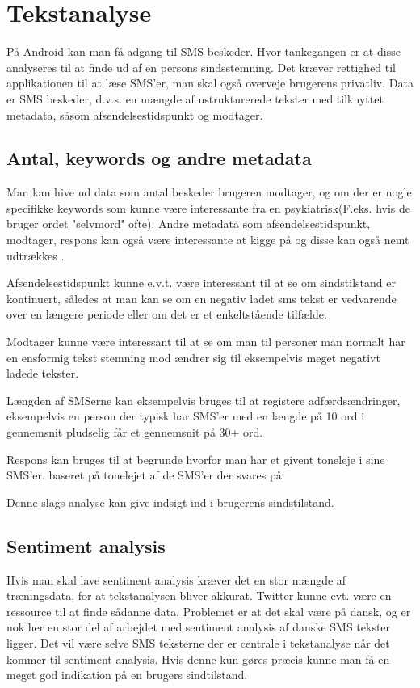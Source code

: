 \section{Tekstanalyse}
På Android kan man få adgang til SMS beskeder. Hvor tankegangen er at disse analyseres til at finde ud af en persons sindsstemning. Det kræver rettighed til applikationen til at læse SMS'er, man skal også overveje brugerens privatliv. Data er SMS beskeder, d.v.s. en mængde af ustrukturerede tekster med tilknyttet metadata, såsom afsendelsestidspunkt og modtager.

\subsection{Antal, keywords og andre metadata}
Man kan hive ud data som antal beskeder brugeren modtager, og om der er nogle specifikke keywords som kunne være interessante fra en psykiatrisk(F.eks. hvis de bruger ordet "selvmord" ofte). Andre metadata som afsendelsestidspunkt, modtager, respons kan også være interessante at kigge på og disse kan også nemt udtrækkes \citep{misc:androidsmsread}.

Afsendelsestidspunkt kunne e.v.t. være interessant til at se om sindstilstand er kontinuert, således at man kan se om en negativ ladet sms tekst er vedvarende over en længere periode eller om det er et enkeltstående tilfælde.
		
Modtager kunne være interessant til at se om man til personer man normalt har en ensformig tekst stemning mod ændrer sig til eksempelvis meget negativt ladede tekster.

Længden af SMSerne kan eksempelvis bruges til at registere adfærdsændringer, eksempelvis en person der typisk har SMS'er med en længde på 10 ord i gennemsnit pludselig får et gennemsnit på 30+ ord.

Respons kan bruges til at begrunde hvorfor man har et givent toneleje i sine SMS'er. baseret på tonelejet af de SMS'er der svares på.

Denne slags analyse kan give indsigt ind i brugerens sindstilstand. 

\subsection{Sentiment analysis}
Hvis man skal lave sentiment analysis kræver det en stor mængde af træningsdata, for at tekstanalysen bliver akkurat. Twitter kunne evt. være en ressource til at finde sådanne data. Problemet er at det skal være på dansk, og er nok her en stor del af arbejdet med sentiment analysis af danske SMS tekster ligger.
Det vil være selve SMS teksterne der er centrale i tekstanalyse når det kommer til sentiment analysis. 
Hvis denne kun gøres præcis kunne man få en meget god indikation på en brugers sindtilstand.

